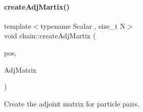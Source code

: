 \paragraph{\texorpdfstring{create\+Adj\+Martix()}{createAdjMartix()}}
{\footnotesize\ttfamily template$<$typename Scalar , size\+\_\+t N$>$ \\
void chain\+::create\+Adj\+Martix (\begin{DoxyParamCaption}\item[{const \mbox{\hyperlink{namespacechain_aa715d2f046187ea9f0c3ea55605d6214}{Vector\+Array}}$<$ Scalar, N $>$ \&}]{pos,  }\item[{\mbox{\hyperlink{namespacechain_a3a021b84403e03113e1dcd61ba304963}{Node\+Array}}$<$ Scalar, N $\ast$(N -\/ 1)/2 $>$ \&}]{Adj\+Matrix }\end{DoxyParamCaption})}



Create the adjoint matrix for particle pairs. 

